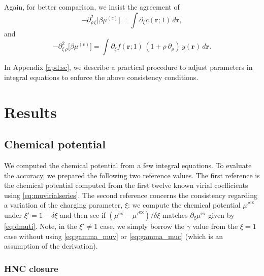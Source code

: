 \documentclass[aip,jcp,reprint,superscriptaddress]{revtex4-1}
\newcommand{\vct}[1]{\mathbf{#1}}
\providecommand{\vr}{} %
\renewcommand{\vr}{\vct{r}}
\newcommand{\supex}[1]{ { { #1 }^{ \mathrm{ex} } } }
\newcommand{\muex}{\supex{\mu}}
\begin{document}
Again, for better comparison,
we insist the agreement of
\begin{equation}
  -\partial^2_{\rho \, \xi} \big[ \beta \mu^{(c)} \big]
  = \int \partial_\xi c(\vr; 1) \, d\vr,
  \label{eq:ddmuc}
\end{equation}
and
\begin{equation}
  -\partial^2_{\xi \, \rho} \big[ \beta \mu^{(v)} \big]
  =  \int
  \partial_\xi f(\vr; 1) \,
  (1 + \rho \, \partial_\rho) \, y(\vr)
  \, d\vr.
  \label{eq:ddmuv}
\end{equation}
%

In Appendix \ref{apd:sc},
  we describe a practical procedure
  to adjust parameters in integral equations
  to enforce the above consistency conditions.





\section{Results}



\subsection{Chemical potential}

We computed the chemical potential from a few integral equations.
%
%
To evaluate the accuracy,
we prepared the following two reference values.
%
The first reference is the chemical potential computed from
the first twelve known virial coefficients
using \eqref{eq:muvirialseries}.
%
The second reference concerns the consistency
regarding a variation of the charging parameter, $\xi$:
%
we compute the chemical potential $\supex{\mu'}$
under $\xi' = 1 - \delta \xi$
and then see if $(\muex - \supex{\mu'})/\delta \xi$
matches
$\partial_\xi \muex$ given by \eqref{eq:dmuti}.
%
Note, in the $\xi' \ne 1$ case, we simply borrow the $\gamma$ value
from the $\xi = 1$ case without using
\eqref{eq:gamma_muv} or \eqref{eq:gamma_muc}
(which is an assumption of the derivation).


\subsubsection{HNC closure}
\end{document}
